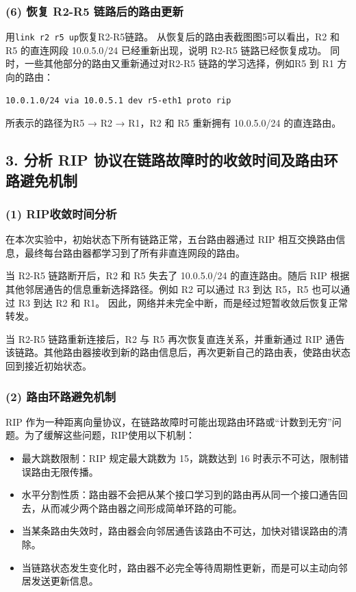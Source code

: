 \documentclass[11pt]{article}
\begin{document}
\subsubsection*{(6) 恢复 R2-R5 链路后的路由更新}
用\texttt{link r2 r5 up}恢复R2-R5链路。
从恢复后的路由表截图图5可以看出，R2 和 R5 的直连网段 10.0.5.0/24 已经重新出现，说明 R2-R5 链路已经恢复成功。
同时，一些其他部分的路由又重新通过对R2-R5 链路的学习选择，例如R5 到 R1 方向的路由：
\begin{lstlisting}
10.0.1.0/24 via 10.0.5.1 dev r5-eth1 proto rip
\end{lstlisting}
所表示的路径为R5 → R2 → R1，R2 和 R5 重新拥有 10.0.5.0/24 的直连路由。

\qquad 

\subsection*{3. 分析 RIP 协议在链路故障时的收敛时间及路由环路避免机制}
\subsubsection*{(1) RIP收敛时间分析}
在本次实验中，初始状态下所有链路正常，五台路由器通过 RIP 相互交换路由信息，最终每台路由器都学习到了所有非直连网段的路由。

当 R2-R5 链路断开后，R2 和 R5 失去了 10.0.5.0/24 的直连路由。随后 RIP 根据其他邻居通告的信息重新选择路径。例如 R2 可以通过 R3 到达 R5，R5 也可以通过 R3 到达 R2 和 R1。
因此，网络并未完全中断，而是经过短暂收敛后恢复正常转发。

当 R2-R5 链路重新连接后，R2 与 R5 再次恢复直连关系，并重新通过 RIP 通告该链路。其他路由器接收到新的路由信息后，再次更新自己的路由表，使路由状态回到接近初始状态。

\subsubsection*{(2) 路由环路避免机制}
RIP 作为一种距离向量协议，在链路故障时可能出现路由环路或“计数到无穷”问题。为了缓解这些问题，RIP使用以下机制：
\begin{itemize}
    \item 最大跳数限制：RIP 规定最大跳数为 15，跳数达到 16 时表示不可达，限制错误路由无限传播。
    \item 水平分割性质：路由器不会把从某个接口学习到的路由再从同一个接口通告回去，从而减少两个路由器之间形成简单环路的可能。
    \item 当某条路由失效时，路由器会向邻居通告该路由不可达，加快对错误路由的清除。
    \item 当链路状态发生变化时，路由器不必完全等待周期性更新，而是可以主动向邻居发送更新信息。
\end{itemize}
\end{document}
